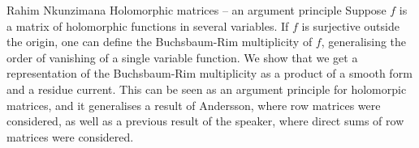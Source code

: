 \talk
{%
    Rahim Nkunzimana
}
{%
    Holomorphic matrices -- an argument principle
}
{%
    Suppose $f$ is a matrix of holomorphic functions in several
    variables. If $f$ is surjective outside the origin, one can define
    the Buchsbaum-Rim multiplicity of $f$, generalising the order of
    vanishing of a single variable function. We show that we get a
    representation of the Buchsbaum-Rim multiplicity as a product of
    a smooth form and a residue current. This can be seen as an
    argument principle for holomorpic matrices, and it generalises a
    result of Andersson, where row matrices were considered, as well
    as a previous result of the speaker, where direct sums of row
    matrices were considered. 
}
